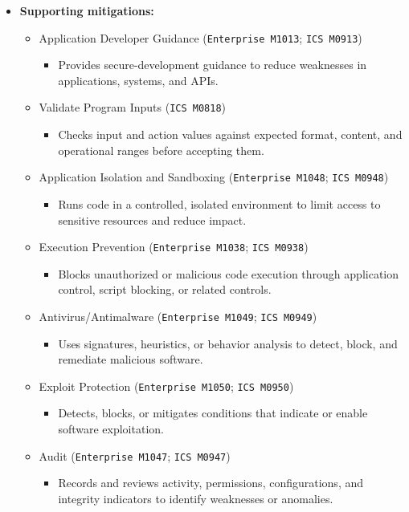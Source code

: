 \documentclass[10pt,a4paper,oneside]{report}
\begin{document}
\begin{itemize}
\item \textbf{Supporting mitigations:}
\begin{itemize}
\item Application Developer Guidance (\texttt{Enterprise M1013}; \texttt{ICS M0913})
\begin{itemize}
\item Provides secure-development guidance to reduce weaknesses in applications, systems, and APIs.
\end{itemize}
\item Validate Program Inputs (\texttt{ICS M0818})
\begin{itemize}
\item Checks input and action values against expected format, content, and operational ranges before accepting them.
\end{itemize}
\item Application Isolation and Sandboxing (\texttt{Enterprise M1048}; \texttt{ICS M0948})
\begin{itemize}
\item Runs code in a controlled, isolated environment to limit access to sensitive resources and reduce impact.
\end{itemize}
\item Execution Prevention (\texttt{Enterprise M1038}; \texttt{ICS M0938})
\begin{itemize}
\item Blocks unauthorized or malicious code execution through application control, script blocking, or related controls.
\end{itemize}
\item Antivirus/Antimalware (\texttt{Enterprise M1049}; \texttt{ICS M0949})
\begin{itemize}
\item Uses signatures, heuristics, or behavior analysis to detect, block, and remediate malicious software.
\end{itemize}
\item Exploit Protection (\texttt{Enterprise M1050}; \texttt{ICS M0950})
\begin{itemize}
\item Detects, blocks, or mitigates conditions that indicate or enable software exploitation.
\end{itemize}
\item Audit (\texttt{Enterprise M1047}; \texttt{ICS M0947})
\begin{itemize}
\item Records and reviews activity, permissions, configurations, and integrity indicators to identify weaknesses or anomalies.

\end{itemize}
\end{itemize}
\end{itemize}
\end{document}
